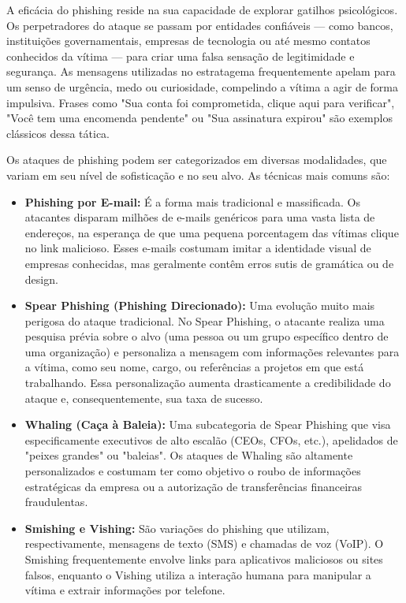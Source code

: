 \documentclass[12pt]{article}
\begin{document}
A eficácia do phishing reside na sua capacidade de explorar gatilhos psicológicos. Os perpetradores do ataque se passam por entidades confiáveis — como bancos, instituições governamentais, empresas de tecnologia ou até mesmo contatos conhecidos da vítima — para criar uma falsa sensação de legitimidade e segurança. As mensagens utilizadas no estratagema frequentemente apelam para um senso de urgência, medo ou curiosidade, compelindo a vítima a agir de forma impulsiva. Frases como "Sua conta foi comprometida, clique aqui para verificar", "Você tem uma encomenda pendente" ou "Sua assinatura expirou" são exemplos clássicos dessa tática.

Os ataques de phishing podem ser categorizados em diversas modalidades, que variam em seu nível de sofisticação e no seu alvo. As técnicas mais comuns são:

\begin{itemize}
\item \textbf{Phishing por E-mail:} É a forma mais tradicional e massificada. Os atacantes disparam milhões de e-mails genéricos para uma vasta lista de endereços, na esperança de que uma pequena porcentagem das vítimas clique no link malicioso. Esses e-mails costumam imitar a identidade visual de empresas conhecidas, mas geralmente contêm erros sutis de gramática ou de design.

\item \textbf{Spear Phishing (Phishing Direcionado):} Uma evolução muito mais perigosa do ataque tradicional. No Spear Phishing, o atacante realiza uma pesquisa prévia sobre o alvo (uma pessoa ou um grupo específico dentro de uma organização) e personaliza a mensagem com informações relevantes para a vítima, como seu nome, cargo, ou referências a projetos em que está trabalhando. Essa personalização aumenta drasticamente a credibilidade do ataque e, consequentemente, sua taxa de sucesso.

\item \textbf{Whaling (Caça à Baleia):} Uma subcategoria de Spear Phishing que visa especificamente executivos de alto escalão (CEOs, CFOs, etc.), apelidados de "peixes grandes" ou "baleias". Os ataques de Whaling são altamente personalizados e costumam ter como objetivo o roubo de informações estratégicas da empresa ou a autorização de transferências financeiras fraudulentas.

\item \textbf{Smishing e Vishing:} São variações do phishing que utilizam, respectivamente, mensagens de texto (SMS) e chamadas de voz (VoIP). O Smishing frequentemente envolve links para aplicativos maliciosos ou sites falsos, enquanto o Vishing utiliza a interação humana para manipular a vítima e extrair informações por telefone.
\end{itemize}
\end{document}
